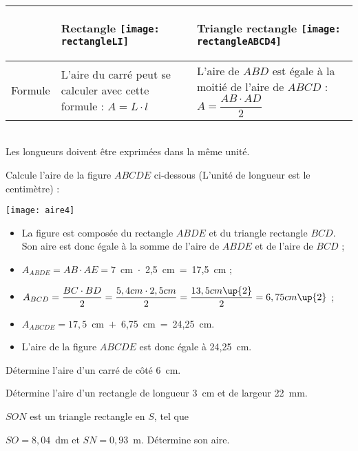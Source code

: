 \begin{methode*1}

\begin{aconnaitre}
\begin{tabularx}{\linewidth}{|c|X|X|}
\hline
& \begin{center} \textbf{\textcolor{H1}{Rectangle}} \texttt{[image: rectangleLI]} \end{center} & \begin{center} \textbf{\textcolor{H1}{Triangle rectangle}} \texttt{[image: rectangleABCD4]} \end{center} \\\hline
Formule & L'aire du carré peut se calculer avec cette formule : \textbf{\textcolor{H1}{$A = L \cdot l$}} & L'aire de $ABD$ est égale à la moitié de l'aire de $ABCD$ : \textbf{\textcolor{H1}{$A = \dfrac{AB \cdot AD}{2}$}} \\\hline
 \end{tabularx} \\[1em]
Les longueurs doivent être exprimées dans la même unité.
\end{aconnaitre}

\begin{exemple*1}
Calcule l'aire de la figure $ABCDE$ ci‑dessous (L'unité de longueur est le centimètre) :
\begin{center}  \texttt{[image: aire4]} \end{center}

 \begin{itemize}
  \item La figure est composée du rectangle $ABDE$ et du triangle rectangle $BCD$. Son aire est donc égale à la somme de l'aire de $ABDE$ et de l'aire de $BCD$ ;
  \item $A_{ABDE} = AB \cdot AE = 7$ cm $\cdot$ 2,5 cm = 17,5 cm ; \\[0.2em]
  \item $A_{BCD} = \dfrac{BC \cdot BD}{2} = \dfrac{5,4 cm \cdot 2,5 cm}{2} = \dfrac{13,5 cm\up{2}}{2} = 6,75 cm\up{2}$ ;\\[0.2em]
  \item $A_{ABCDE} = 17,5$ cm $+$ 6,75 cm = 24,25 cm.
  \item L'aire de la figure $ABCDE$ est donc égale à 24,25 cm.
  \end{itemize}
\end{exemple*1}

\exercice 
Détermine l'aire d'un carré de côté 6 cm. 

\exercice 
Détermine l'aire d'un rectangle de longueur 3 cm et de largeur 22 mm.
     
\exercice 
$SON$ est un triangle rectangle en $S$, tel que 

$SO = 8,04$ dm et $SN = 0,93$ m. Détermine son aire.
 
\end{methode*1}

